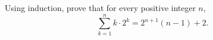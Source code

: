 Using induction, prove that for every positive integer $n$,
\[\sum_{k=1}^{n}k\cdot2^k=2^{n+1}(n-1)+2.\]

